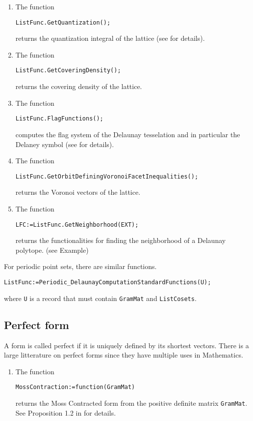 \documentclass[12pt]{amsart}
\begin{document}
\begin{enumerate}
\item The function
\begin{verbatim}
ListFunc.GetQuantization();
\end{verbatim}
returns the quantization integral of the lattice
(see \cite{voronoiDSV} for details).

\item The function
\begin{verbatim}
ListFunc.GetCoveringDensity();
\end{verbatim}
returns the covering density of the lattice.

\item The function
\begin{verbatim}
ListFunc.FlagFunctions();
\end{verbatim}
computes the flag system of the Delaunay tesselation and in particular the
Delaney symbol (see \cite{DressHusonDelgado} for details).

\item The function
\begin{verbatim}
ListFunc.GetOrbitDefiningVoronoiFacetInequalities();
\end{verbatim}
returns the Voronoi vectors of the lattice.

\item The function
\begin{verbatim}
LFC:=ListFunc.GetNeighborhood(EXT);
\end{verbatim}
returns the functionalities for finding the neighborhood of a Delaunay polytope.
(see Example)


\end{enumerate}
For periodic point sets, there are similar functions.
\begin{verbatim}
ListFunc:=Periodic_DelaunayComputationStandardFunctions(U);
\end{verbatim}
where {\tt U} is a record that must contain {\tt GramMat} and
{\tt ListCosets}.


\subsection{Perfect form}

A form is called perfect if it is uniquely defined by its shortest vectors.
There is a large litterature on perfect forms since they have multiple uses in Mathematics.

\begin{enumerate}
\item The function
\begin{verbatim}
MossContraction:=function(GramMat)
\end{verbatim}
returns the Moss Contracted form from the positive definite matrix {\tt GramMat}. See Proposition 1.2 in \cite{moss} for details.


\end{enumerate}
\end{document}
